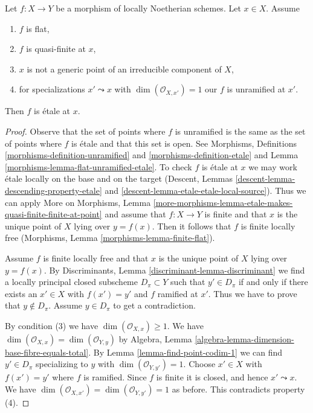 \begin{lemma}
\label{lemma-ramification-quasi-finite-flat}
Let $f : X \to Y$ be a morphism of locally Noetherian schemes.
Let $x \in X$. Assume
\begin{enumerate}
\item $f$ is flat,
\item $f$ is quasi-finite at $x$,
\item $x$ is not a generic point of an irreducible component of $X$,
\item for specializations $x' \leadsto x$ with
$\dim(\mathcal{O}_{X, x'}) = 1$ our $f$ is unramified at $x'$.
\end{enumerate}
Then $f$ is \'etale at $x$.
\end{lemma}

\begin{proof}
Observe that the set of points where $f$ is unramified is the same as
the set of points where $f$ is \'etale and that this set is open.
See Morphisms, Definitions \ref{morphisms-definition-unramified}
and \ref{morphisms-definition-etale} and
Lemma \ref{morphisms-lemma-flat-unramified-etale}.
To check $f$ is \'etale at $x$ we may work \'etale
locally on the base and on the
target (Descent, Lemmas \ref{descent-lemma-descending-property-etale} and
\ref{descent-lemma-etale-etale-local-source}).
Thus we can apply More on Morphisms, Lemma
\ref{more-morphisms-lemma-etale-makes-quasi-finite-finite-at-point}
and assume that $f : X \to Y$ is finite and that $x$ is the unique
point of $X$ lying over $y = f(x)$.
Then it follows that $f$ is finite locally free
(Morphisms, Lemma \ref{morphisms-lemma-finite-flat}).

\medskip\noindent
Assume $f$ is finite locally free and that $x$ is the unique point of
$X$ lying over $y = f(x)$. By
Discriminants, Lemma \ref{discriminant-lemma-discriminant}
we find a locally principal closed subscheme $D_\pi \subset Y$
such that $y' \in D_\pi$ if and only if there exists an $x' \in X$
with $f(x') = y'$ and $f$ ramified at $x'$. Thus we have to prove
that $y \not \in D_\pi$. Assume $y \in D_\pi$ to get a contradiction.

\medskip\noindent
By condition (3) we have $\dim(\mathcal{O}_{X, x}) \geq 1$.
We have $\dim(\mathcal{O}_{X, x}) = \dim(\mathcal{O}_{Y, y})$ by
Algebra, Lemma \ref{algebra-lemma-dimension-base-fibre-equals-total}.
By Lemma \ref{lemma-find-point-codim-1}
we can find $y' \in D_\pi$ specializing to $y$
with $\dim(\mathcal{O}_{Y, y'}) = 1$.
Choose $x' \in X$ with $f(x') = y'$ where $f$ is ramified. Since $f$
is finite it is closed, and hence $x' \leadsto x$.
We have $\dim(\mathcal{O}_{X, x'}) = \dim(\mathcal{O}_{Y, y'}) = 1$
as before. This contradicts property (4).
\end{proof}
